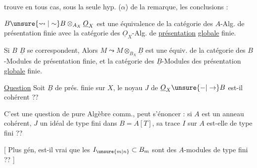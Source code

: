 \unsure{On|[On|Du} trouve en tous cas, sous la seule hyp. ($\alpha$) de la remarque, les conclusions :

$B\unsure{\leadsto|\sim} B\otimes_{A_X}\underline O_X$ est une équivalence de la catégorie des $A$-Alg. de présentation finie avec la catégorie des $\underline O_X$-Alg. de \uline{présentation} \uline{globale} finie.

Si $B$   $\underline B$ se correspondent, Alors $M\leadsto M\otimes_{B_X}\underline B$ est une équiv. de la catégorie des $B$-Modules de présentation finie, et la catégorie des $\underline B$-Modules des présentation \uline{globale} finie.

\uline{Question} Soit $\underline B$ de  prés. finie sur $X$, le noyau $J$ de $\underline O_X\unsure{-|\to}B$ est-il cohérent ??

C'est une question de pure Algèbre comm., peut s'énoncer : si $A$ est un anneau cohérent,  $J$ un idéal de type fini dans $B=A[T]$, sa trace $I$ sur $A$ est-elle de type fini ??

[ Plus gén, est-il vrai que les $I_{\unsure{m|n}}\subset B_m$ sont des $A$-modules de type fini ?? ]

